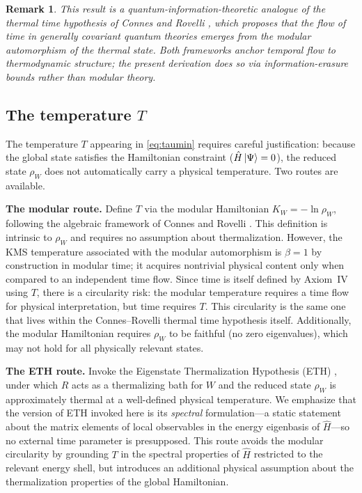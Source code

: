 \documentclass[11pt, a4paper]{article}
\newtheorem{remark}{Remark}
\begin{document}
\begin{remark}
This result is a quantum-information-theoretic analogue of the thermal time hypothesis of Connes and Rovelli \cite{Connes1994}, which proposes that the flow of time in generally covariant quantum theories emerges from the modular automorphism of the thermal state. Both frameworks anchor temporal flow to thermodynamic structure; the present derivation does so via information-erasure bounds rather than modular theory.
\end{remark}

\subsection{The temperature $T$}
\label{sec:temperature}

The temperature $T$ appearing in \eqref{eq:taumin} requires careful justification: because the global state satisfies the Hamiltonian constraint ($\hat{H}\ket{\Psi} = 0$), the reduced state $\rho_W$ does not automatically carry a physical temperature. Two routes are available.

\medskip
\noindent\textbf{The modular route.} Define $T$ via the modular Hamiltonian $K_W = -\ln \rho_W$, following the algebraic framework of Connes and Rovelli \cite{Connes1994}. This definition is intrinsic to $\rho_W$ and requires no assumption about thermalization. However, the KMS temperature associated with the modular automorphism is $\beta = 1$ by construction in modular time; it acquires nontrivial physical content only when compared to an independent time flow. Since time is itself defined by Axiom~IV using $T$, there is a circularity risk: the modular temperature requires a time flow for physical interpretation, but time requires $T$. This circularity is the same one that lives within the Connes--Rovelli thermal time hypothesis itself. Additionally, the modular Hamiltonian requires $\rho_W$ to be faithful (no zero eigenvalues), which may not hold for all physically relevant states.

\medskip
\noindent\textbf{The ETH route.} Invoke the Eigenstate Thermalization Hypothesis (ETH) \cite{Srednicki1994}, under which $R$ acts as a thermalizing bath for $W$ and the reduced state $\rho_W$ is approximately thermal at a well-defined physical temperature. We emphasize that the version of ETH invoked here is its \emph{spectral} formulation---a static statement about the matrix elements of local observables in the energy eigenbasis of $\hat{H}$---so no external time parameter is presupposed. This route avoids the modular circularity by grounding $T$ in the spectral properties of $\hat{H}$ restricted to the relevant energy shell, but introduces an additional physical assumption about the thermalization properties of the global Hamiltonian.
\end{document}
